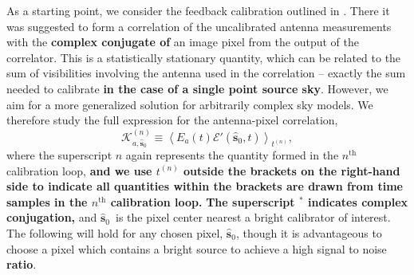 \documentclass[a4paper,fleqn,usenatbib]{../mnras}
\newcommand{\spix}{\ensuremath{\hat{\mathbf{s}}_{0}}}
\newcommand{\Kna}[1][n]{\ensuremath{\mathcal{K}^{(#1)}_{a,\spix}}}
\begin{document}
As a starting point, we consider the feedback calibration outlined in \citealt{mor11}. There it 
was suggested to form a correlation of the uncalibrated antenna measurements with the \textbf{complex conjugate of} an image 
pixel from the output of the correlator. This is a statistically stationary quantity, which can be 
related to the sum of visibilities involving the antenna used in the correlation -- exactly the sum 
needed to calibrate \textbf{in the case of a single point source sky}. However, we aim for a more 
generalized solution for arbitrarily complex sky models. We therefore study the full expression 
for the antenna-pixel correlation,
\begin{equation}\label{eq:Kna_def}
\Kna \equiv \left<E_a(t) \mathcal{E}'(\spix,t)\right>_{t^{(n)}},
\end{equation}
where the superscript $n$ again represents the quantity formed in the $n^\mathrm{th}$ 
calibration loop,
\textbf{and we use $t^{(n)}$ outside the brackets on the right-hand side to indicate all quantities
within the brackets are drawn from time samples in the $n^\mathrm{th}$ calibration loop.}
\textbf{The superscript $^*$ indicates complex conjugation,}
and \spix\, is the pixel center nearest a bright calibrator of interest. The 
following will hold for any chosen pixel, \spix, though it is advantageous to choose a pixel which 
contains a bright source to achieve a high signal to noise \textbf{ratio}. 
\end{document}

